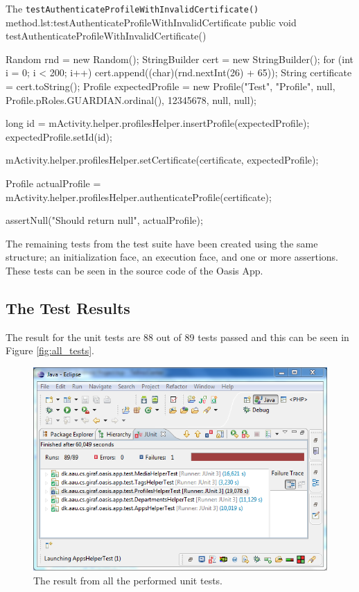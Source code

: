 \begin{Java}{The \texttt{testAuthenticateProfileWithInvalidCertificate()} method.}{lst:testAuthenticateProfileWithInvalidCertificate}
public void testAuthenticateProfileWithInvalidCertificate() {
	Random rnd = new Random();
	StringBuilder cert = new StringBuilder();
	for (int i = 0; i < 200; i++)
	{
		cert.append((char)(rnd.nextInt(26) + 65));
	}
	String certificate = cert.toString();
	Profile expectedProfile = new Profile("Test", "Profile", null, Profile.pRoles.GUARDIAN.ordinal(), 12345678, null, null);

	long id = mActivity.helper.profilesHelper.insertProfile(expectedProfile);
	expectedProfile.setId(id);
	
	mActivity.helper.profilesHelper.setCertificate(certificate, expectedProfile);
			
	Profile actualProfile = mActivity.helper.profilesHelper.authenticateProfile(certificate);

	assertNull("Should return null", actualProfile);
}
\end{Java}

The remaining tests from the test suite have been created using the same structure; an initialization face, an execution face, and one or more assertions.
These tests can be seen in the source code of the Oasis App.

\subsection{The Test Results}
The result for the unit tests are 88 out of 89 tests passed and this can be seen in Figure \vref{fig:all_tests}.

\begin{figure}[htbp]
	\centering
		\includegraphics[width=\textwidth]{Images/unit_testing/all_tests.PNG}
	\caption{The result from all the performed unit tests.}
	\label{fig:all_tests}
\end{figure}

